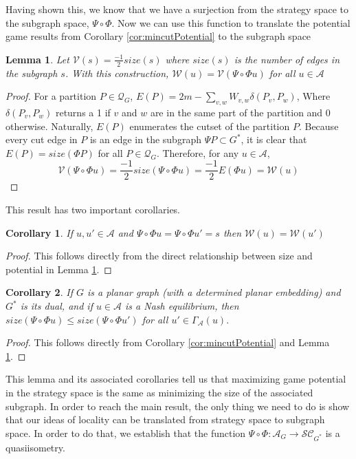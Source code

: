 \documentclass{article}
\newtheorem{corollary}{Corollary}[section]
\newtheorem{lemma}{Lemma}[section]
\begin{document}
    Having shown this, we know that we have a surjection from the strategy space to the subgraph space, $\Psi\circ\Phi$. Now we can use this function to translate the potential game results from Corollary \ref{cor:mincutPotential} to the subgraph space
\begin{lemma}\label{lem:Potentialissize}
    Let $\mathcal{V}(s)=\frac{-1}{2}size(s)$ where $size(s)$ is the number of edges in the subgraph $s$. With this construction, $\mathcal{W}(u)=\mathcal{V}(\Psi\circ\Phi u)$ for all $u\in \mathcal{A}$ 
\end{lemma}
\begin{proof}
    For a partition $P\in \mathcal{Q}_{G}$, $E(P)= 2m -\sum_{v,w}W_{v,w}\delta(P_v,P_w)$, Where $\delta(P_v,P_w)$ returns a 1 if $v$ and $w$ are in the same part of the partition and 0 otherwise. Naturally, $E(P)$ enumerates the cutset of the partition $P$.  Because every cut edge in $P$ is an edge in the subgraph $\Psi P\subset G^*$, it is clear that $E(P)=size(\Phi P)$ for all $P\in \mathcal{Q}_G$. Therefore, for any $u\in \mathcal{A}$, \[\mathcal{V}(\Psi\circ\Phi u)=\frac{-1}{2}size(\Psi\circ\Phi u)=\frac{-1}{2}E(\Phi u)=\mathcal{W}(u)\] 
\end{proof}

This result has two important corollaries.

\begin{corollary}\label{cor:equalpotential}
    If $u,u'\in \mathcal{A}$ and $\Psi\circ\Phi u = \Psi\circ\Phi u' =s$ then $\mathcal{W}(u)=\mathcal{W}(u')$
\end{corollary}
\begin{proof}
    This follows directly from the direct relationship between size and potential in Lemma \ref{lem:Potentialissize}.
\end{proof}

\begin{corollary}\label{cor:minimizingsize}
    If $G$ is a planar graph (with a determined planar embedding) and $G^*$ is its dual, and if $u\in \mathcal{A}$ is a Nash equilibrium, then $size(\Psi\circ\Phi u)\leq size(\Psi\circ\Phi u')$ for all $u'\in \Gamma_{\mathcal{A}}(u).$ 
\end{corollary}
\begin{proof}
    This follows directly from Corollary \ref{cor:mincutPotential} and Lemma \ref{lem:Potentialissize}.
\end{proof}

This lemma and its associated corollaries tell us that maximizing game potential in the strategy space is the same as minimizing the size of the associated subgraph. In order to reach the main result, the only thing we need to do is show that our ideas of locality can be translated from strategy space to subgraph space. In order to do that, we establish that the function $\Psi\circ\Phi:\mathcal{A}_G\to \mathcal{SC}_{G^*}$ is a quasiisometry. 
\end{document}
